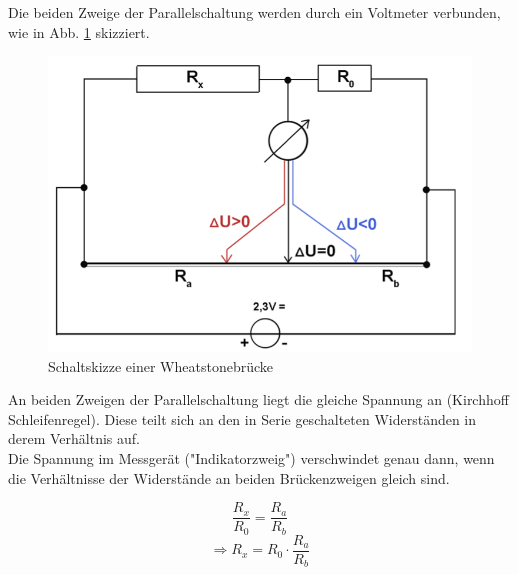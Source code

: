 \documentclass[12pt,a4paper]{article}
\begin{document}
\begin{multicols}{2}
Die beiden Zweige der Parallelschaltung werden durch ein Voltmeter verbunden, wie in Abb. \ref{fig:wheatstone_schaltplan} skizziert.



\begin{figure}[H]
	\centering
	\includegraphics[scale=0.50]{./figure/wheatstone_schaltplan.png}
	\caption{Schaltskizze einer Wheatstonebrücke}
	\label{fig:wheatstone_schaltplan}
\end{figure}

An beiden Zweigen der Parallelschaltung liegt die gleiche Spannung an (Kirchhoff Schleifenregel). Diese teilt sich an den in Serie geschalteten Widerständen in derem Verhältnis auf.\\
Die Spannung im Messgerät ("Indikatorzweig") verschwindet genau dann, wenn die Verhältnisse der Widerstände an beiden Brückenzweigen gleich sind.

$$\frac{R_x}{R_0} = \frac{R_a}{R_b}$$
$$\Rightarrow R_x = R_0 \cdot \frac{R_a}{R_b}$$


\end{multicols}
\end{document}
